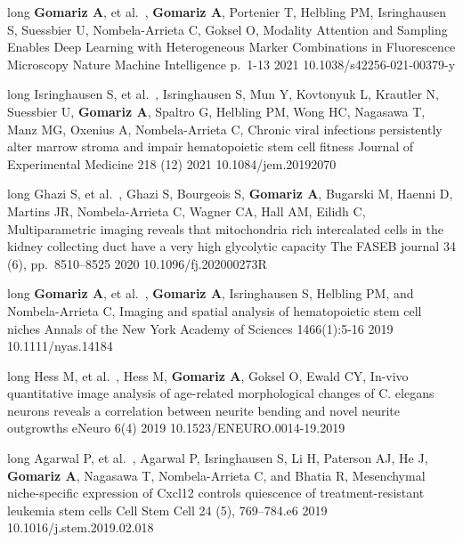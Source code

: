 \begin{cvpublications}
\cvpublication
{long}
{
    {\textbf{Gomariz A}, et al.~,}
    {\textbf{Gomariz A}, Portenier T, Helbling PM, Isringhausen S, Suessbier U, Nombela-Arrieta C, Goksel O,}
}
{Modality Attention and Sampling Enables Deep Learning with Heterogeneous Marker Combinations in Fluorescence Microscopy}
{Nature Machine Intelligence}
{p.\ 1-13}
{2021}
{10.1038/s42256-021-00379-y}

\cvpublication
{long}
{
    {Isringhausen S, et al.~,}
    {Isringhausen S, Mun Y, Kovtonyuk L, Krautler N, Suessbier U, \textbf{Gomariz A}, Spaltro G, Helbling PM, Wong HC, Nagasawa T, Manz MG, Oxenius A, Nombela-Arrieta C,}
}
{Chronic viral infections persistently alter marrow stroma and impair hematopoietic stem cell fitness
}
{Journal of Experimental Medicine}
{218 (12)}
{2021}
{10.1084/jem.20192070}

\cvpublication
{long}
{
    {Ghazi S, et al.~,}
    {Ghazi S, Bourgeois S, \textbf{Gomariz A}, Bugarski M, Haenni D, Martins JR, Nombela-Arrieta C, Wagner CA, Hall AM, Eilidh C,}
}
{Multiparametric imaging reveals that mitochondria rich intercalated cells in the kidney collecting duct have a very high glycolytic capacity}
{The FASEB journal}
{34 (6), pp.\ 8510–8525}
{2020}
{10.1096/fj.202000273R}


\cvpublication
{long}
{
    {\textbf{Gomariz A}, et al.~,}
    {\textbf{Gomariz A}, Isringhausen S, Helbling PM, and Nombela-Arrieta C,}
}
{Imaging and spatial analysis of hematopoietic stem cell niches}
{Annals of the New York Academy of Sciences}
{1466(1):5-16}
{2019}
{10.1111/nyas.14184}

\cvpublication
{long}
{
    {Hess M, et al.~,}
    {Hess M, \textbf{Gomariz A}, Goksel O, Ewald CY,}
}
{In-vivo quantitative image analysis of age-related morphological changes of C. elegans neurons reveals a correlation between neurite bending and novel neurite outgrowths}
{eNeuro}
{6(4)}
{2019}
{10.1523/ENEURO.0014-19.2019}

\cvpublication 
{long}
{
    {Agarwal P, et al.~,}
    {Agarwal P, Isringhausen S, Li H, Paterson AJ, He J, \textbf{Gomariz A}, Nagasawa T, Nombela-Arrieta C, and Bhatia R,}
}
{Mesenchymal niche-specific expression of Cxcl12 controls quiescence of treatment-resistant leukemia stem cells}
{Cell Stem Cell}
{24 (5), 769–784.e6}
{2019}
{10.1016/j.stem.2019.02.018}


\end{cvpublications}
